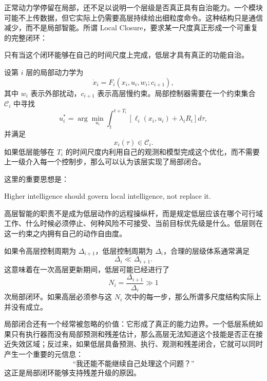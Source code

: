 正常动力学停留在局部，还不足以说明一个层级是否真正具有自治能力。一个模块可能不上传数据，但它实际上仍需要高层持续给出细粒度命令。这种结构只是通信减少，而不是局部智能。所谓 Local Closure，要求某一尺度真正形成一个可重复的完整闭环：
\begin{statementbox}
\centering
{}
\end{statementbox}
只有当这个闭环能够在自己的时间尺度上完成，低层才具有真正的功能自治。

设第 $i$ 层的局部动力学为
\begin{equation}
\dot{x}_i
=
F_i
\left(
x_i,
u_i,
w_i;
c_{i+1}
\right),
\end{equation}
其中 $w_i$ 表示外部扰动，$c_{i+1}$ 表示高层慢约束。局部控制器需要在一个约束集合 $\mathcal C_i$ 中寻找
\begin{equation}
u_i^\ast
=
\arg\min_{u_i}
\int_{t}^{t+T_i}
\left[
\ell_i(x_i,u_i)
+
\lambda_i R_i
\right]
d\tau ,
\end{equation}
并满足
\begin{equation}
x_i(\tau)\in\mathcal C_i.
\end{equation}
如果低层能够在 $T_i$ 的时间尺度内利用自己的观测和模型完成这个优化，而不需要上一级介入每一个控制步，那么可以认为该层实现了局部闭合。

这里的重要思想是：
\begin{statementbox}
Higher intelligence should govern local intelligence,
not replace it.
\end{statementbox}
高层智能的职责不是成为低层动作的远程操纵杆，而是规定低层应该在哪个可行域工作、什么时候必须停止、何种风险不可接受、当前目标优先级是什么。低层则在这一约束之内拥有自己的动作自由度。

如果令高层控制周期为 $\Delta_{i+1}$，低层控制周期为 $\Delta_i$，合理的层级体系通常满足
\begin{equation}
\Delta_i
\ll
\Delta_{i+1}.
\end{equation}
这意味着在一次高层更新期间，低层可能已经进行了
\begin{equation}
N_i
=
\frac{\Delta_{i+1}}{\Delta_i}
\gg 1
\end{equation}
次局部闭环。如果高层必须参与这 $N_i$ 次中的每一步，那么所谓多尺度结构实际上并没有成立。

局部闭合还有一个经常被忽略的价值：它形成了真正的能力边界。一个低层系统如果只有执行器而没有局部预测和残差估计，那么高层无法知道这个技能是否正在接近失效区域；反过来，如果低层具备预测、执行、观测和残差闭合，它就可以同时产生一个重要的元信息：
\[
\text{``我还能不能继续自己处理这个问题？''}
\]
这正是局部闭环能够支持残差升级的原因。

